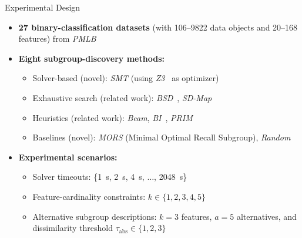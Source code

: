 \documentclass[en, navbaroff, handout]{sdqbeamer}
\begin{document}
\begin{frame}[t]{Experimental Design}
	\begin{itemize}
		\item \textbf{27 binary-classification datasets} (with 106--9822 data objects and 20--168 features) from \emph{PMLB}~\cite{olson2017pmlb, romano2021pmlb}
		\pause
		\vspace{\baselineskip}
		\item \textbf{Eight subgroup-discovery methods:}
		\begin{itemize}
			\item Solver-based (novel): \emph{SMT} (using \emph{Z3}~\cite{bjorner2015nuz, deMoura2008z3} as optimizer)
			\item Exhaustive search (related work): \emph{BSD}~\cite{lemmerich2010fast}, \emph{SD-Map}~\cite{atzmueller2006sd}
			\item Heuristics (related work): \emph{Beam}, \emph{BI}~\cite{mampaey2012efficient}, \emph{PRIM}~\cite{friedman1999bump}
			\item Baselines (novel): \emph{MORS} (Minimal Optimal Recall Subgroup), \emph{Random}
		\end{itemize}
		\pause
		\vspace{\baselineskip}
		\item \textbf{Experimental scenarios:}
		\begin{itemize}
			\item Solver timeouts: \{1~s, 2~s, 4~s, $\dots$, 2048~s\}
			\item Feature-cardinality constraints: $k \in \{1, 2, 3, 4, 5\}$
			\item Alternative subgroup descriptions: $k=3$ features, $a=5$ alternatives, and dissimilarity threshold $\tau_{\text{abs}} \in \{1, 2, 3\}$

\end{itemize}
\end{itemize}
\end{frame}
\end{document}
